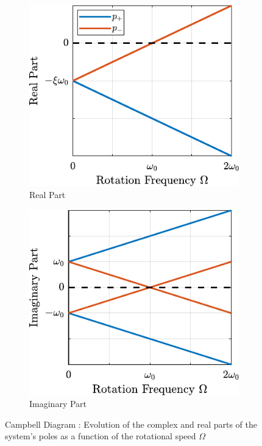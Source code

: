\documentclass{ISMA_USD2020}
\begin{document}
\begin{figure}[htbp]
\begin{subfigure}[c]{0.4\linewidth}
\includegraphics[width=\linewidth]{figs/campbell_diagram_real.pdf}
\caption{\label{fig:campbell_diagram_real} Real Part}
\end{subfigure}
\hfill
\begin{subfigure}[c]{0.4\linewidth}
\includegraphics[width=\linewidth]{figs/campbell_diagram_imag.pdf}
\caption{\label{fig:campbell_diagram_imag} Imaginary Part}
\end{subfigure}
\hfill
\caption{\label{fig:campbell_diagram}Campbell Diagram : Evolution of the complex and real parts of the system's poles as a function of the rotational speed \(\Omega\)}
\centering
\end{figure}
\end{document}

